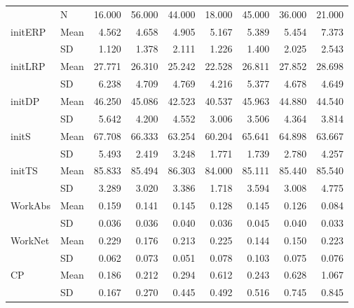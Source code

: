 \begin{longtable}{llrrrrrrr}
\bottomrule
\endlastfoot
{} & N &     16.000 &     56.000 &     44.000 &     18.000 &     45.000 &     36.000 &     21.000 \\
\multirow{2}{*}{initERP} & Mean &      4.562 &      4.658 &      4.905 &      5.167 &      5.389 &      5.454 &      7.373 \\
   & SD &      1.120 &      1.378 &      2.111 &      1.226 &      1.400 &      2.025 &      2.543 \\
\cline{1-9}
\multirow{2}{*}{initLRP} & Mean &     27.771 &     26.310 &     25.242 &     22.528 &     26.811 &     27.852 &     28.698 \\
   & SD &      6.238 &      4.709 &      4.769 &      4.216 &      5.377 &      4.678 &      4.649 \\
\cline{1-9}
\multirow{2}{*}{initDP} & Mean &     46.250 &     45.086 &     42.523 &     40.537 &     45.963 &     44.880 &     44.540 \\
   & SD &      5.642 &      4.200 &      4.552 &      3.006 &      3.506 &      4.364 &      3.814 \\
\cline{1-9}
\multirow{2}{*}{initS} & Mean &     67.708 &     66.333 &     63.254 &     60.204 &     65.641 &     64.898 &     63.667 \\
   & SD &      5.493 &      2.419 &      3.248 &      1.771 &      1.739 &      2.780 &      4.257 \\
\cline{1-9}
\multirow{2}{*}{initTS} & Mean &     85.833 &     85.494 &     86.303 &     84.000 &     85.111 &     85.440 &     85.540 \\
   & SD &      3.289 &      3.020 &      3.386 &      1.718 &      3.594 &      3.008 &      4.775 \\
\cline{1-9}
\multirow{2}{*}{WorkAbs} & Mean &      0.159 &      0.141 &      0.145 &      0.128 &      0.145 &      0.126 &      0.084 \\
   & SD &      0.036 &      0.036 &      0.040 &      0.036 &      0.045 &      0.040 &      0.033 \\
\cline{1-9}
\multirow{2}{*}{WorkNet} & Mean &      0.229 &      0.176 &      0.213 &      0.225 &      0.144 &      0.150 &      0.223 \\
   & SD &      0.062 &      0.073 &      0.051 &      0.078 &      0.103 &      0.075 &      0.076 \\
\cline{1-9}
\multirow{2}{*}{CP} & Mean &      0.186 &      0.212 &      0.294 &      0.612 &      0.243 &      0.628 &      1.067 \\
   & SD &      0.167 &      0.270 &      0.445 &      0.492 &      0.516 &      0.745 &      0.845 \\

\end{longtable}
